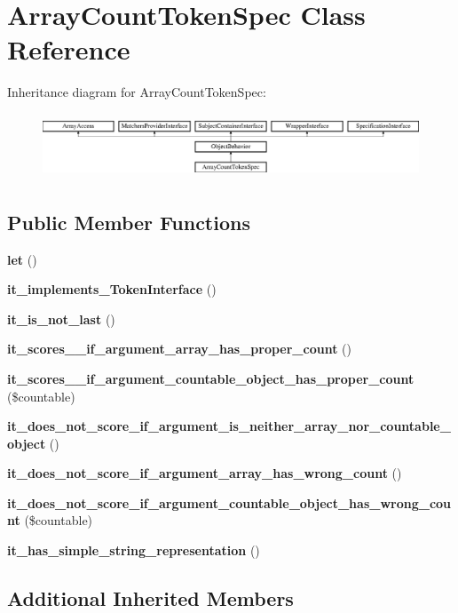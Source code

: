 \section{Array\+Count\+Token\+Spec Class Reference}
\label{classspec_1_1_prophecy_1_1_argument_1_1_token_1_1_array_count_token_spec}
Inheritance diagram for Array\+Count\+Token\+Spec\+:\begin{figure}[H]
\begin{center}
\leavevmode
\includegraphics[height=1.953488cm]{classspec_1_1_prophecy_1_1_argument_1_1_token_1_1_array_count_token_spec}
\end{center}
\end{figure}
\subsection*{Public Member Functions}
\begin{DoxyCompactItemize}
\item 
{\bf let} ()
\item 
{\bf it\+\_\+implements\+\_\+\+Token\+Interface} ()
\item 
{\bf it\+\_\+is\+\_\+not\+\_\+last} ()
\item 
{\bf it\+\_\+scores\+\_\+\_\+if\+\_\+argument\+\_\+array\+\_\+has\+\_\+proper\+\_\+count} ()
\item 
{\bf it\+\_\+scores\+\_\+\_\+if\+\_\+argument\+\_\+countable\+\_\+object\+\_\+has\+\_\+proper\+\_\+count} (\$countable)
\item 
{\bf it\+\_\+does\+\_\+not\+\_\+score\+\_\+if\+\_\+argument\+\_\+is\+\_\+neither\+\_\+array\+\_\+nor\+\_\+countable\+\_\+object} ()
\item 
{\bf it\+\_\+does\+\_\+not\+\_\+score\+\_\+if\+\_\+argument\+\_\+array\+\_\+has\+\_\+wrong\+\_\+count} ()
\item 
{\bf it\+\_\+does\+\_\+not\+\_\+score\+\_\+if\+\_\+argument\+\_\+countable\+\_\+object\+\_\+has\+\_\+wrong\+\_\+count} (\$countable)
\item 
{\bf it\+\_\+has\+\_\+simple\+\_\+string\+\_\+representation} ()
\end{DoxyCompactItemize}
\subsection*{Additional Inherited Members}


